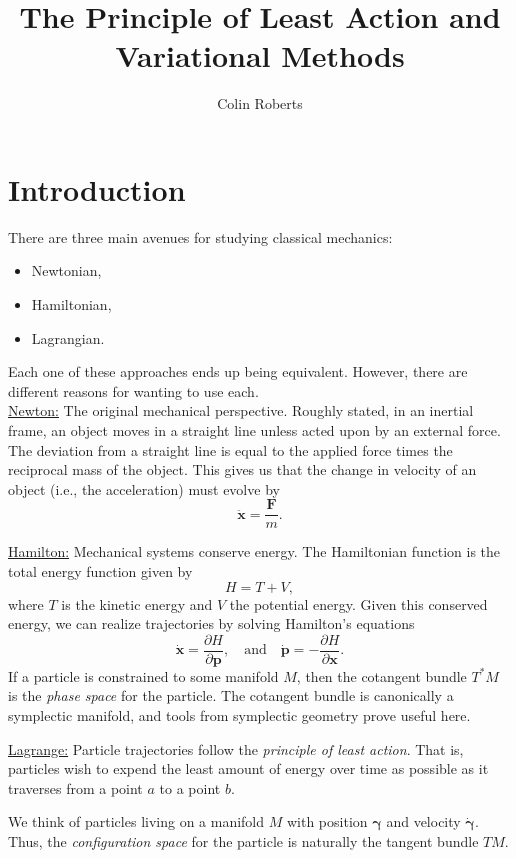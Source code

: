\documentclass[12pt]{article}
\title{The Principle of Least Action and Variational Methods}
\author{Colin Roberts}
\newcommand{\position}{\boldsymbol{\gamma}}
\newcommand{\velocity}{\boldsymbol{\dot{\gamma}}}
\theoremstyle{definition}
\begin{document}
\maketitle

\setcounter{section}{-1}
\section{Introduction}
There are three main avenues for studying classical mechanics:
\begin{itemize}
    \item Newtonian,
    \item Hamiltonian,
    \item Lagrangian.
\end{itemize}
Each one of these approaches ends up being equivalent.  However, there are different reasons for wanting to use each.\\

\noindent \underline{Newton:} The original mechanical perspective.  Roughly stated, in an inertial frame, an object moves in a straight line unless acted upon by an external force. The deviation from a straight line is equal to the applied force times the reciprocal mass of the object. This gives us that the change in velocity of an object (i.e., the acceleration) must evolve by
\[
\mathbf{\ddot{x}} = \frac{\mathbf{F}}{m}.
\]

\noindent \underline{Hamilton:} Mechanical systems conserve energy.  The Hamiltonian function is the total energy function given by
\[
H=T+V,
\]
where $T$ is the kinetic energy and $V$ the potential energy.  Given this conserved energy, we can realize trajectories by solving Hamilton's equations
\[
\mathbf{\dot{x}}=\frac{\partial H}{\partial \mathbf{p}}, \quad \textrm{and} \quad \mathbf{\dot{p}} = -\frac{\partial H}{\partial \mathbf{x}}.
\]
If a particle is constrained to some manifold $M$, then the cotangent bundle $T^*M$ is the \emph{phase space} for the particle. The cotangent bundle is canonically a symplectic manifold, and tools from symplectic geometry prove useful here.

\noindent \underline{Lagrange:} Particle trajectories follow the \emph{principle of least action}. That is, particles wish to expend the least amount of energy over time as possible as it traverses from a point $a$ to a point $b$. 

We think of particles living on a manifold $M$ with position $\position$ and velocity $\velocity$.  Thus, the \emph{configuration space} for the particle is naturally the tangent bundle $TM$.  
\end{document}

